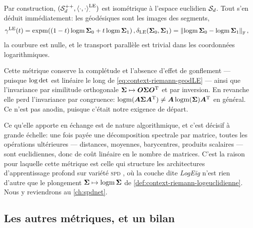 Par construction, $(\mathcal{S}_{d}^{++},\left\langle \cdot, \cdot \right\rangle_{\cdot}^{\mathrm{LE}})$ est isométrique à l'espace euclidien $\mathcal{S}_{d}$. Tout s'en déduit immédiatement: les géodésiques sont les images des segments,
\begin{equation}
  \gamma^{\mathrm{LE}}(t) = \operatorname{\operatorname{expm}}\!\left( (1-t)\operatorname{\operatorname{logm}}\boldsymbol{\Sigma}_0 + t\operatorname{\operatorname{logm}}\boldsymbol{\Sigma}_1 \right),\\
  \delta_{\mathrm{LE}}(\boldsymbol{\Sigma}_0,\boldsymbol{\Sigma}_1) = \left\lVert\operatorname{\operatorname{logm}}\boldsymbol{\Sigma}_0 - \operatorname{\operatorname{logm}}\boldsymbol{\Sigma}_1\right\rVert_{\mathbb{F}},
  \label{eq:context-riemann-geodLE}
\end{equation}
la courbure est nulle, et le transport parallèle est trivial dans les coordonnées logarithmiques.

\begin{remark}
\label{rem:context-riemann-LEbilan}
  Cette métrique conserve la complétude et l'absence d'effet de gonflement --- puisque $\log\operatorname{\operatorname{det}}$ est linéaire le long de \cref{eq:context-riemann-geodLE} --- ainsi que l'invariance par similitude orthogonale $\boldsymbol{\Sigma}\mapsto\boldsymbol{O}\boldsymbol{\Sigma}\boldsymbol{O}^{\mathrm{T}}$ et par inversion. En revanche elle perd l'invariance par congruence: $\operatorname{\operatorname{logm}}(\boldsymbol{A}\boldsymbol{\Sigma}\boldsymbol{A}^{\mathrm{T}})\ne\boldsymbol{A}\operatorname{\operatorname{logm}}(\boldsymbol{\Sigma})\boldsymbol{A}^{\mathrm{T}}$ en général. Ce n'est pas anodin, puisque c'était notre exigence de départ.

  Ce qu'elle apporte en échange est de nature algorithmique, et c'est décisif à grande échelle: une fois payée une décomposition spectrale par matrice, toutes les opérations ultérieures --- distances, moyennes, barycentres, produits scalaires --- sont euclidiennes, donc de coût linéaire en le nombre de matrices. C'est la raison pour laquelle cette métrique est celle qui structure les architectures d'apprentissage profond sur variété \textsc{spd} , où la couche dite \textit{LogEig} n'est rien d'autre que le plongement $\boldsymbol{\Sigma}\mapsto\operatorname{\operatorname{logm}}\boldsymbol{\Sigma}$ de \cref{def:context-riemann-logeuclidienne}. Nous y reviendrons au \cref{ch:spdnet}.
\end{remark}

\subsection{Les autres métriques, et un bilan}

